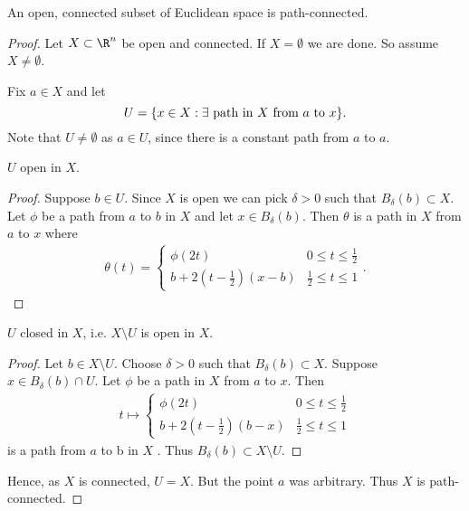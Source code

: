 \begin{proposition} \label{prp:47}
    An open, connected subset of Euclidean space is path-connected.
\end{proposition}

\begin{proof}
    Let $X\subset \R^n$ be open and connected. 
    If $X = \emptyset$ we are done. 
    So assume $X \neq \emptyset$. 

    Fix $a \in X$ and let \[ U = \{x\in X : \exists \textup{ path in } X \textup{ from } a \textup{ to } x\}. \]
    Note that $U\neq \emptyset$ as $a\in U$, since  there is a constant path from $a$ to $a$.

    \begin{claim}
        $U$ open in $X$.
    \end{claim} 
    \begin{proof}
    Suppose $b\in U$. 
    Since $X$ is open we can pick $\delta > 0$ such that $B_\delta(b) \subset X$. 
    Let $\phi$ be a path from $a$ to $b$ in $X$ and let $x \in B_\delta(b)$. 
    Then $\theta$ is a path in $X$ from $a$ to $x$ where 
    \begin{align*}
        \theta(t) = \begin{cases}
        \phi(2t) & 0\leq t \leq \frac{1}{2}\\
        b + 2(t-\frac{1}{2})(x-b) & \frac{1}{2}\leq t \leq 1
        \end{cases}.
    \end{align*} 
\end{proof}

\begin{claim}
    $U$ closed in $X$, i.e. $X\setminus U$ is open in $X$.
\end{claim} 

\begin{proof}
    Let $b \in X \setminus U$. 
    Choose $\delta> 0$ such that $B_\delta(b) \subset X.$ Suppose $x\in B_\delta (b)\cap U$. 
    Let $\phi$ be a path in $X$ from $a$ to $x$. Then 
    \begin{align*}
        t \mapsto \begin{cases}
        \phi(2t) & 0\leq t \leq \frac{1}{2}\\
        b + 2(t-\frac{1}{2})(b-x) & \frac{1}{2}\leq t \leq 1
        \end{cases}
    \end{align*} 
    is a path from $a$ to b in $X$ \Lightning. 
    Thus $B_\delta (b) \subset X\setminus U$.
    \end{proof}
    Hence, as $X$ is connected, $U=X$. 
    But the point $a$ was arbitrary. 
    Thus $X$ is path-connected.
\end{proof}

